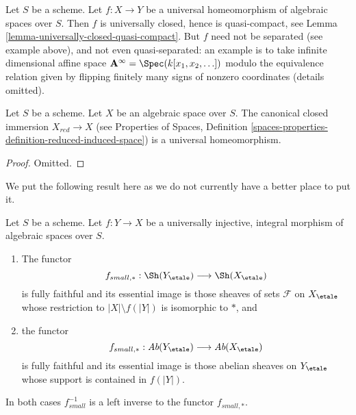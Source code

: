 \noindent
Let $S$ be a scheme.
Let $f : X \to Y$ be a universal homeomorphism of algebraic spaces
over $S$. Then $f$ is universally closed, hence is quasi-compact, see
Lemma \ref{lemma-universally-closed-quasi-compact}.
But $f$ need not be separated (see example above), and not even
quasi-separated: an example is to take infinite dimensional affine
space $\mathbf{A}^\infty = \Spec(k[x_1, x_2, \ldots])$ modulo
the equivalence relation given by flipping finitely many signs of
nonzero coordinates (details omitted).

\begin{lemma}
\label{lemma-reduction-universal-homeomorphism}
Let $S$ be a scheme. Let $X$ be an algebraic space over $S$.
The canonical closed immersion $X_{red} \to X$ (see
Properties of Spaces, Definition
\ref{spaces-properties-definition-reduced-induced-space})
is a universal homeomorphism.
\end{lemma}

\begin{proof}
Omitted.
\end{proof}

\noindent
We put the following result here as we do not currently have a better
place to put it.

\begin{lemma}
\label{lemma-integral-universally-injective-push-pull}
Let $S$ be a scheme. Let $f : Y \to X$ be a universally injective,
integral morphism of algebraic spaces over $S$.
\begin{enumerate}
\item The functor
$$
f_{small, *} : \Sh(Y_\etale) \longrightarrow \Sh(X_\etale)
$$
is fully faithful and its essential image is those sheaves of sets
$\mathcal{F}$ on $X_\etale$ whose restriction to $|X| \setminus f(|Y|)$
is isomorphic to $*$, and
\item the functor
$$
f_{small, *} : \textit{Ab}(Y_\etale) \longrightarrow \textit{Ab}(X_\etale)
$$
is fully faithful and its essential image is those abelian sheaves on
$Y_\etale$ whose support is contained in $f(|Y|)$.
\end{enumerate}
In both cases $f_{small}^{-1}$ is a left inverse to the functor $f_{small, *}$.
\end{lemma}


